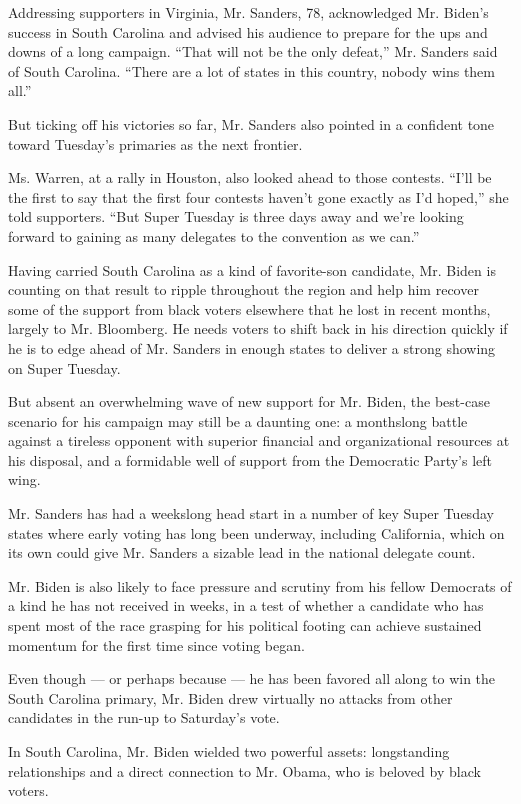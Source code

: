 Addressing supporters in Virginia, Mr. Sanders, 78, acknowledged Mr.
Biden's success in South Carolina and advised his audience to prepare
for the ups and downs of a long campaign. ``That will not be the only
defeat,'' Mr. Sanders said of South Carolina. ``There are a lot of
states in this country, nobody wins them all.''

But ticking off his victories so far, Mr. Sanders also pointed in a
confident tone toward Tuesday's primaries as the next frontier.

Ms. Warren, at a rally in Houston, also looked ahead to those contests.
``I'll be the first to say that the first four contests haven't gone
exactly as I'd hoped,'' she told supporters. ``But Super Tuesday is
three days away and we're looking forward to gaining as many delegates
to the convention as we can.''

Having carried South Carolina as a kind of favorite-son candidate, Mr.
Biden is counting on that result to ripple throughout the region and
help him recover some of the support from black voters elsewhere that he
lost in recent months, largely to Mr. Bloomberg. He needs voters to
shift back in his direction quickly if he is to edge ahead of Mr.
Sanders in enough states to deliver a strong showing on Super Tuesday.

But absent an overwhelming wave of new support for Mr. Biden, the
best-case scenario for his campaign may still be a daunting one: a
monthslong battle against a tireless opponent with superior financial
and organizational resources at his disposal, and a formidable well of
support from the Democratic Party's left wing.

Mr. Sanders has had a weekslong head start in a number of key Super
Tuesday states where early voting has long been underway, including
California, which on its own could give Mr. Sanders a sizable lead in
the national delegate count.

Mr. Biden is also likely to face pressure and scrutiny from his fellow
Democrats of a kind he has not received in weeks, in a test of whether a
candidate who has spent most of the race grasping for his political
footing can achieve sustained momentum for the first time since voting
began.

Even though --- or perhaps because --- he has been favored all along to
win the South Carolina primary, Mr. Biden drew virtually no attacks from
other candidates in the run-up to Saturday's vote.

In South Carolina, Mr. Biden wielded two powerful assets: longstanding
relationships and a direct connection to Mr. Obama, who is beloved by
black voters.

